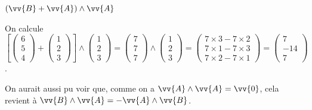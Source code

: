


\begin{enonce}
$(\vv{B} + \vv{A})\wedge\vv{A}$
\end{enonce}


\begin{corrige}
	On calcule $
	\left[
	\begin{pmatrix}
		6 \\ 5 \\ 4
	\end{pmatrix} +
	\begin{pmatrix}
		1 \\ 2 \\ 3
	\end{pmatrix}
	\right]\wedge
	\begin{pmatrix}
		1 \\ 2 \\ 3
	\end{pmatrix}
	= \begin{pmatrix}
		7 \\ 7 \\ 7
	\end{pmatrix}\wedge
	\begin{pmatrix}
		1 \\ 2 \\ 3
	\end{pmatrix}
	= \begin{pmatrix}
		7\times 3 - 7\times 2 \\
		7\times 1 - 7\times 3 \\
		7\times 2 - 7\times 1
	\end{pmatrix}
	= \begin{pmatrix}
		7 \\ -14 \\ 7
	\end{pmatrix}
	$.

	On aurait aussi pu voir que, comme on a $\vv{A}\wedge\vv{A}=\vv{0}$, cela revient à $\vv{B}\wedge\vv{A} = -\vv{A}\wedge\vv{B}$.
\end{corrige}



